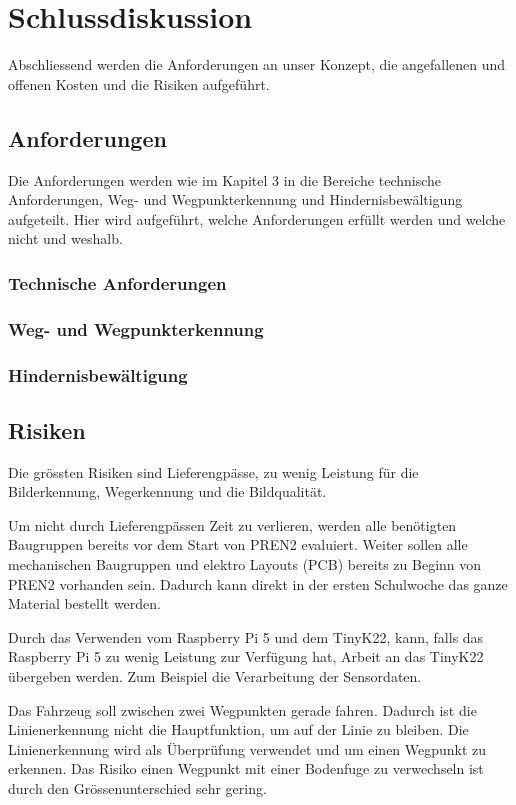 \documentclass[../main.tex]{subfiles}
\begin{document}
\newpage
\section{Schlussdiskussion}

Abschliessend werden die Anforderungen an unser Konzept, die angefallenen und offenen Kosten und die Risiken aufgeführt. 
\subsection{Anforderungen}
Die Anforderungen werden wie im Kapitel 3 in die Bereiche technische Anforderungen, Weg- und Wegpunkterkennung und Hindernisbewältigung aufgeteilt. Hier wird aufgeführt, welche Anforderungen erfüllt werden und welche nicht und weshalb.
\subsubsection{Technische Anforderungen}
\subsubsection{Weg- und Wegpunkterkennung}
\subsubsection{Hindernisbewältigung}
\subsection{Risiken}
Die grössten Risiken sind Lieferengpässe, zu wenig Leistung für die Bilderkennung, Wegerkennung und die Bildqualität. 

Um nicht durch Lieferengpässen Zeit zu verlieren, werden alle benötigten Baugruppen bereits vor dem Start von PREN2 evaluiert. Weiter sollen alle mechanischen Baugruppen und elektro Layouts (PCB) bereits zu Beginn von PREN2 vorhanden sein. Dadurch kann direkt in der ersten Schulwoche das ganze Material bestellt werden.

Durch das Verwenden vom Raspberry Pi 5 und dem TinyK22, kann, falls das Raspberry Pi 5 zu wenig Leistung zur Verfügung hat, Arbeit an das TinyK22 übergeben werden. Zum Beispiel die Verarbeitung der Sensordaten. 

Das Fahrzeug soll zwischen zwei Wegpunkten gerade fahren. Dadurch ist die Linienerkennung nicht die Hauptfunktion, um auf der Linie zu bleiben. Die Linienerkennung wird als Überprüfung verwendet und um einen Wegpunkt zu erkennen. Das Risiko einen Wegpunkt mit einer Bodenfuge zu verwechseln ist durch den Grössenunterschied sehr gering. 
\end{document}
